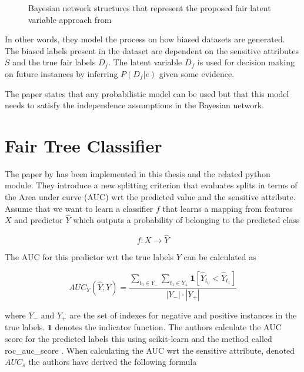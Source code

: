\begin{figure}[h!]
    \centering
    \caption{Bayesian network structures that represent the proposed
fair latent variable approach from \cite{Choi:2021:AIII}}
    \label{fig:choinetwork}
\end{figure}

In other words, they model the process on how biased datasets are generated. The biased labels present in the dataset are dependent on the sensitive attributes $S$ and the true fair labels $D_f$. The latent variable $D_f$ is used for decision making on future instances by inferring $P(D_f|e)$ given some evidence.

The paper states that any probabilistic model can be used but that this model needs to satisfy the independence assumptions in the Bayesian network.

\section{Fair Tree Classifier}
\label{sec:fairtree}

The paper by \citet{Antonio:2021:arXiv} has been implemented in this thesis and the related python module. They introduce a new splitting criterion that evaluates splits in terms of the Area under curve (AUC) wrt the predicted value and the sensitive attribute. Assume that we want to learn a classifier $f$ that learns a mapping from features $X$ and predictor $\hat{Y}$ which outputs a probability of belonging to the predicted class

$$
f: X \rightarrow \hat{Y}
$$

The AUC for this predictor wrt the true labels $Y$ can be calculated as

\begin{equation*}
    AUC_Y(\hat{Y}, Y) =  \frac
    {
        \sum_{t_0 \in Y_{-}} \sum_{t_1 \in Y_{+}}  \textbf{1}[\hat{Y}_{t_0} < \hat{Y}_{t_1}]
    }
    {
        |Y_{-}| \cdot |Y_{+}|
    }
\end{equation*}

where $Y_-$ and $Y_+$ are the set of indexes for negative and positive instances in the true labels. $\textbf{1}$ denotes the indicator function. The authors calculate the AUC score for the predicted labels this using scikit-learn \cite{Pedregosa:2011:JMLR} and the method called roc\_auc\_score \cite{Buitinck:2013:PKDD}. When calculating the AUC wrt the sensitive attribute, denoted $AUC_s$ the authors have derived the following formula

